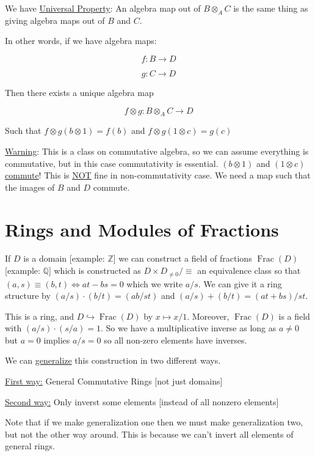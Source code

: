 \documentclass{article}
\theoremstyle{definition}
\begin{document}
We have \underline{Universal Property}: An algebra map out of \(B \otimes _A C\) is the same thing as giving algebra maps out of \(B\) and \(C\).

In other words, if we have algebra maps:

\[
    f: B \to D
\]

\[
    g: C \to D
\]

Then there exists a unique algebra map

\[
    f \otimes g: B \otimes _A C \to D
\]

Such that \(f \otimes g(b \otimes 1)=f(b)\) and \(f \otimes g(1 \otimes c) = g(c)\) 

\underline{Warning}: This is a class on commutative algebra, so we can assume everything is commutative, but in this case commutativity is essential. \((b \otimes 1)\) and \((1 \otimes c)\) \underline{commute}! This is \underline{NOT} fine in non-commutativity case. We need a map such that the images of \(B\) and \(D\) commute.

\section*{Rings and Modules of Fractions}

If \(D\) is a domain [example: \(\mathbb{Z}\)] we can construct a field of fractions \(\operatorname{Frac}(D)\) [example: \(\mathbb{Q}\)] which is constructed as \(D \times D_{\neq 0} / \equiv\) an equivalence class so that \((a,s)\equiv (b,t)\iff at - bs = 0\) which we write \(a / s\). We can give it a ring structure by \((a / s) \cdot (b / t) = (ab / st)\) and \((a / s) + (b / t) = (at + bs) / st\).

This is a ring, and \(D \hookrightarrow \operatorname{Frac}(D) \) by \(x \mapsto x / 1\). Moreover, \(\operatorname{Frac}(D) \) is a field with \((a / s) \cdot (s / a) = 1\). So we have a multiplicative inverse as long as \(a \neq 0\) but \(a = 0\) implies \(a / s = 0\) so all non-zero elements have inverses.

We can \underline{generalize} this construction in two different ways.

\underline{First way:} General Commutative Rings [not just domains]

\underline{Second way:} Only inverst some elements [instead of all nonzero elements]

Note that if we make generalization one then we must make generalization two, but not the other way around. This is because we can't invert all elements of general rings.
\end{document}
